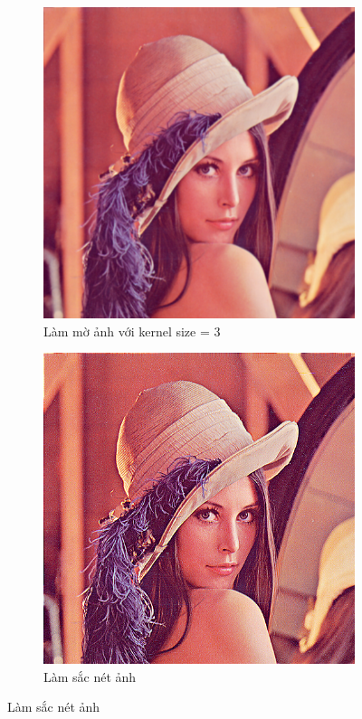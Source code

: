 \documentclass[]{article}
\begin{document}
\begin{figure}[!ht]
  \begin{subfigure}[b]{0.45\linewidth}
    \includegraphics[width=\linewidth]{image/Lenna_blur.png}
    \caption{Làm mờ ảnh với kernel size = 3}
  \end{subfigure}
  \begin{subfigure}[b]{0.45\linewidth}
    \includegraphics[width=\linewidth]{image/Lenna_sharpen.png}
    \caption{Làm sắc nét ảnh}
  \end{subfigure}
\end{figure}
\end{document}
